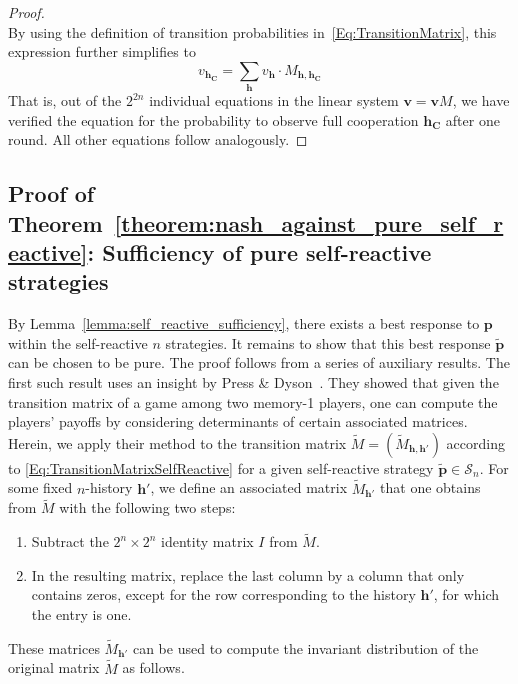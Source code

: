 \documentclass[9pt,twoside,lineno]{pnas-new}
\theoremstyle{plainCl1}
\theoremstyle{plainCl2}
\begin{document}
\begin{proof}
\begin{equation}
\end{equation}
By using the definition of transition probabilities in~\eqref{Eq:TransitionMatrix}, this expression further simplifies to
\begin{equation} 
v_\mathbf{h_C} = \sum_{\mathbf{h}} v_{\mathbf{h}} \cdot M_{\mathbf{h},\mathbf{h_C}}
\end{equation}
That is, out of the $2^{2n}$ individual equations in the linear system $\mathbf{v}\!=\!\mathbf{v} M$, we have verified the equation for the probability to observe full cooperation $\mathbf{h_C}$ after one round. All other equations follow analogously.
\end{proof}






\subsection{Proof of Theorem~\ref{theorem:nash_against_pure_self_reactive}: Sufficiency of pure self-reactive strategies}

By Lemma~\ref{lemma:self_reactive_sufficiency}, there exists a best response to $\mathbf{p}$ within the self-reactive $n$ strategies. 
It remains to show that this best response $\mathbf{\tilde p}$ can be chosen to be pure. 
The proof follows from a series of auxiliary results. 
The first such result uses an insight by Press \& Dyson~\citep{press:PNAS:2012}. 
They showed that given the transition matrix of a game among two memory-1 players, one can compute the players' payoffs by considering determinants of certain associated matrices. 
Herein, we apply their method to the transition matrix $\tilde M\!=\!(\tilde M_{\mathbf{h},\mathbf{h'}})$ according to \eqref{Eq:TransitionMatrixSelfReactive} for a given self-reactive strategy $\mathbf{\tilde p}\!\in\!\mathcal{S}_n$. 
For some fixed $n$-history $\mathbf{h'}$, we define an associated matrix $\tilde M_\mathbf{h'}$ that one obtains from  $\tilde M$ with the following two steps:
\begin{enumerate}
\item Subtract the $2^n\!\times\!2^n$ identity matrix $I$ from $\tilde M$. 
\item In the resulting matrix, replace the last column by a column that only contains zeros, except for the row corresponding to the history $\mathbf{h'}$, for which the entry is one. 
\end{enumerate}
These matrices $\tilde M_\mathbf{h'}$ can be used to compute the invariant distribution of the original matrix $\tilde M$ as follows.\\
\end{document}

